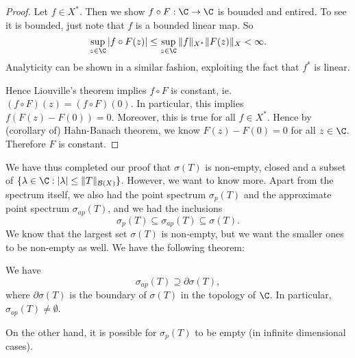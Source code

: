 \documentclass[a4paper]{article}
\begin{document}
\begin{proof}
  Let $f \in X^*$. Then we show $f \circ F: \C \to \C$ is bounded and entired. To see it is bounded, just note that $f$ is a bounded linear map. So
  \[
    \sup_{z \in \C} |f\circ F(z)| \leq \sup_{ z \in \C} \|f\|_{X^*} \|F(z)\|_X < \infty.
  \]
  Analyticity can be shown in a similar fashion, exploiting the fact that $f^*$ is linear.

  Hence Liouville's theorem implies $f \circ F$ is constant, ie. $(f \circ F)(z) = (f\circ F)(0)$. In particular, this implies $f(F(z) - F(0)) = 0$. Moreover, this is true for all $f \in X^*$. Hence by (corollary of) Hahn-Banach theorem, we know $F(z) - F(0) = 0$ for all $z \in \C$. Therefore $F$ is constant.
\end{proof}
We have thus completed our proof that $\sigma(T)$ is non-empty, closed and a subset of $\{\lambda \in \C: |\lambda| \leq \|T\|_{\mathcal{B}(X)}\}$. However, we want to know more. Apart from the spectrum itself, we also had the point spectrum $\sigma_p(T)$ and the approximate point spectrum $\sigma_{ap}(T)$, and we had the inclusions
\[
  \sigma_p(T) \subseteq \sigma_{ap}(T) \subseteq \sigma(T).
\]
We know that the largest set $\sigma(T)$ is non-empty, but we want the smaller ones to be non-empty as well. We have the following theorem:
\begin{thm}
  We have
  \[
    \sigma_{ap}(T) \supseteq \partial \sigma(T),
  \]
  where $\partial \sigma(T)$ is the boundary of $\sigma(T)$ in the topology of $\C$. In particular, $\sigma_{op}(T) \not= \emptyset$.
\end{thm}
On the other hand, it is possible for $\sigma_p(T)$ to be empty (in infinite dimensional cases).
\end{document}
